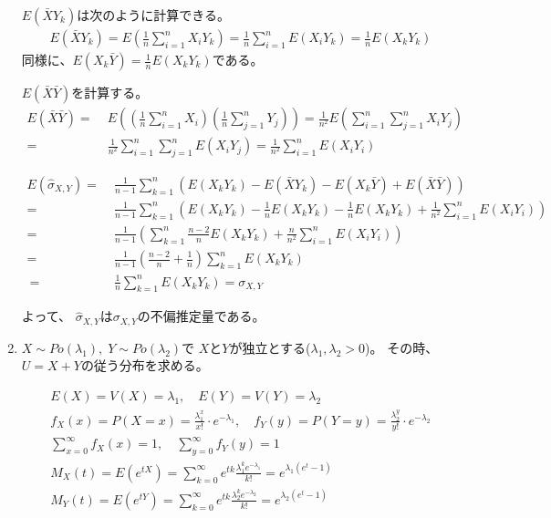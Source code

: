 \documentclass[12pt,b5paper]{ltjsarticle}
\begin{document}
\begin{enumerate}
      $E(\bar{X}Y_{k})$は次のように計算できる。
      \begin{gather}
       E(\bar{X}Y_{k})
       = E \left( \frac{1}{n}\sum_{i=1}^{n}X_{i}Y_{k} \right)
       = \frac{1}{n}\sum_{i=1}^{n} E( X_{i}Y_{k} )
       = \frac{1}{n} E( X_{k}Y_{k} )
      \end{gather}
      同様に、$E(X_{k}\bar{Y})=\frac{1}{n} E(X_{k}Y_{k})$である。

      $E(\bar{X}\bar{Y})$を計算する。
      \begin{align}
       E(\bar{X}\bar{Y})
       =&\; E \left( \left(\frac{1}{n}\sum_{i=1}^{n}X_{i}\right) \left(\frac{1}{n}\sum_{j=1}^{n}Y_{j} \right) \right)
       = \frac{1}{n^{2}} E \left( \sum_{i=1}^{n}\sum_{j=1}^{n} X_{i}Y_{j} \right)\\
       =&\; \frac{1}{n^{2}} \sum_{i=1}^{n}\sum_{j=1}^{n} E (X_{i}Y_{j} )
       = \frac{1}{n^{2}} \sum_{i=1}^{n} E(X_{i}Y_{i})
      \end{align}

      \begin{align}
       E(\hat{\sigma}_{X,Y})
        =&\; \frac{1}{n-1}\sum_{k=1}^{n}(E(X_{k}Y_{k}) -E(\bar{X}Y_{k})-E(X_{k}\bar{Y}) + E(\bar{X}\bar{Y}) )\\
       =&\; \frac{1}{n-1}\sum_{k=1}^{n}(E(X_{k}Y_{k})
       -\frac{1}{n} E( X_{k}Y_{k} )
       -\frac{1}{n} E(X_{k}Y_{k})
       + \frac{1}{n^{2}} \sum_{i=1}^{n} E(X_{i}Y_{i}) )\\
       =&\; \frac{1}{n-1}\left( \sum_{k=1}^{n}\frac{n-2}{n}E(X_{k}Y_{k})
       +\frac{n}{n^{2}} \sum_{i=1}^{n} E(X_{i}Y_{i}) \right)\\
       =&\; \frac{1}{n-1}\left(\frac{n-2}{n} +\frac{1}{n}\right)\sum_{k=1}^{n}E(X_{k}Y_{k})\\
       ~=&\; \frac{1}{n} \sum_{k=1}^{n}E(X_{k}Y_{k}) = \sigma_{X,Y}
      \end{align}

      よって、
      $\hat{\sigma}_{X,Y}$は$\sigma_{X,Y}$の不偏推定量である。

      \hrulefill

 \item
      $X\sim Po(\lambda_{1}),\; Y\sim Po(\lambda_{2})$で
      $X$と$Y$が独立とする($\lambda_{1},\lambda_{2}>0$)。
      その時、
      $U=X+Y$の従う分布を求める。

      \dotfill

      \begin{gather}
       E(X)=V(X)=\lambda_{1},\quad E(Y)=V(Y)=\lambda_{2}\\
       f_{X}(x)=P(X=x)=\frac{\lambda_{1}^{x}}{x!}\cdot e^{-\lambda_{1}}
       ,\quad f_{Y}(y)=P(Y=y)=\frac{\lambda_{2}^{y}}{y!}\cdot e^{-\lambda_{2}}\\
       \sum_{x=0}^{\infty}f_{X}(x)=1,\quad \sum_{y=0}^{\infty}f_{Y}(y)=1\\
       M_{X}(t)=E(e^{tX})
       =\sum_{k=0}^{\infty}e^{tk}\frac{\lambda_{1}^{k}e^{-\lambda_{1}}}{k!}
       =e^{\lambda_{1}(e^{t}-1)}\\
       M_{Y}(t)=E(e^{tY})
       =\sum_{k=0}^{\infty}e^{tk}\frac{\lambda_{2}^{k}e^{-\lambda_{2}}}{k!}
       =e^{\lambda_{2}(e^{t}-1)}
      \end{gather}


\end{enumerate}
\end{document}
